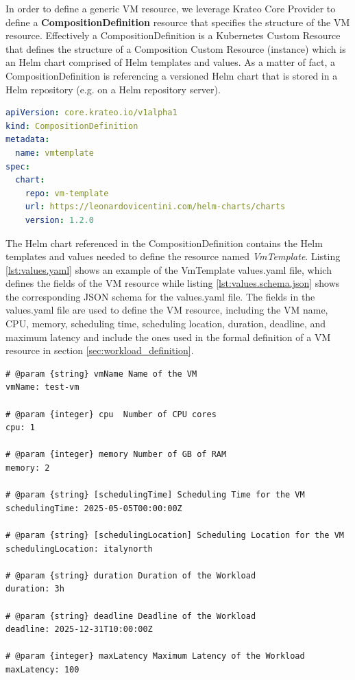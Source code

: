 
In order to define a generic VM resource, we leverage Krateo Core Provider to define a \textbf{CompositionDefinition} resource that specifies the structure of the VM resource.
Effectively a CompositionDefinition is a Kubernetes Custom Resource that defines the structure of a Composition Custom Resource (instance) which is an Helm chart comprised of Helm templates and values.
As a matter of fact, a CompositionDefinition is referencing a versioned Helm chart that is stored in a Helm repository (e.g. on a Helm repository server).

\begin{lstlisting}[language=yaml, caption={CompositionDefinition}, label={lst:composition_definition}]
apiVersion: core.krateo.io/v1alpha1
kind: CompositionDefinition
metadata:
  name: vmtemplate
spec:
  chart:
    repo: vm-template
    url: https://leonardovicentini.com/helm-charts/charts
    version: 1.2.0
\end{lstlisting}

The Helm chart referenced in the CompositionDefinition contains the Helm templates and values needed to define the resource named \textit{VmTemplate}.
Listing \ref{lst:values.yaml} shows an example of the VmTemplate values.yaml file, which defines the fields of the VM resource while listing \ref{lst:values.schema.json} shows the corresponding JSON schema for the values.yaml file.
The fields in the values.yaml file are used to define the VM resource, including the VM name, CPU, memory, scheduling time, scheduling location, duration, deadline, and maximum latency and include the ones used in the formal definition of a VM resource in section \ref{sec:workload_definition}.

\begin{lstlisting}[language=yaml_1, caption={values.yaml}, label={lst:values.yaml}, float=htpb]
# @param {string} vmName Name of the VM
vmName: test-vm

# @param {integer} cpu  Number of CPU cores
cpu: 1

# @param {integer} memory Number of GB of RAM
memory: 2

# @param {string} [schedulingTime] Scheduling Time for the VM
schedulingTime: 2025-05-05T00:00:00Z

# @param {string} [schedulingLocation] Scheduling Location for the VM
schedulingLocation: italynorth

# @param {string} duration Duration of the Workload
duration: 3h

# @param {string} deadline Deadline of the Workload
deadline: 2025-12-31T10:00:00Z

# @param {integer} maxLatency Maximum Latency of the Workload
maxLatency: 100
\end{lstlisting}

